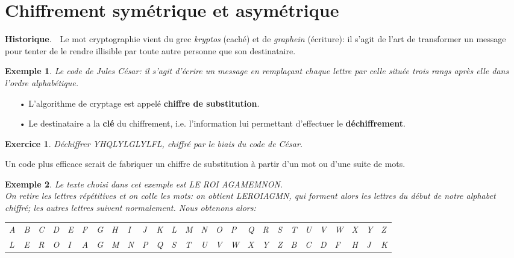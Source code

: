 \documentclass[12pt]{report}
\newtheorem*{ex}{Exemple}
\newtheorem*{exo}{Exercice}
\begin{document}
\section{Chiffrement symétrique et asymétrique}


{\textbf{Historique}}.\ \ Le mot cryptographie vient du grec \textit{kryptos} (caché) et de \textit{graphein} (écriture): il s'agit de l'art de transformer un message pour tenter de le rendre illisible par toute autre personne que son destinataire.

\begin{ex}
Le code de Jules César: il s'agit d'écrire un message en remplaçant chaque lettre par celle située trois rangs après elle dans l'ordre alphabétique.
\end{ex}

\begin{itemize}
\item[•] L'algorithme de cryptage est appelé \textbf{chiffre de substitution}.
\item[•] Le destinataire a la \textbf{clé} du chiffrement, i.e. l'information lui permettant d'effectuer le \textbf{déchiffrement}.
\end{itemize}


\begin{exo}
Déchiffrer YHQLYLGLYLFL, chiffré par le biais du code de César.
\end{exo}

Un code plus efficace serait de fabriquer un chiffre de substitution à partir d'un mot ou d'une suite de mots.

\begin{ex}
Le texte choisi dans cet exemple est LE ROI AGAMEMNON.\\
On retire les lettres répétitives et on colle les mots: on obtient LEROIAGMN, qui forment alors les lettres du début de notre alphabet chiffré; les autres lettres suivent normalement. Nous obtenons alors:
  
\begin{tabular}{p{0.1cm}p{0.1cm}p{0.1cm}p{0.1cm}p{0.1cm}p{0.1cm}p{0.1cm}p{0.1cm}p{0.1cm}p{0.1cm}p{0.1cm}p{0.1cm}p{0.1cm}p{0.1cm}p{0.1cm}p{0.1cm}p{0.1cm}p{0.1cm}p{0.1cm}p{0.1cm}p{0.1cm}p{0.1cm}p{0.1cm}p{0.1cm}p{0.1cm}p{0.1cm}}
 A & B & C & D & E & F & G & H & I & J & K & L & M & N &O &P & Q & R & S & T & U & V & W & X & Y & Z   \\
L & E & R & O & I & A & G & M & N & P & Q  & S & T & U & V & W & X & Y & Z & B & C & D & F & H & J & K 
\end{tabular}\\  
\end{ex}
 
\end{document}
